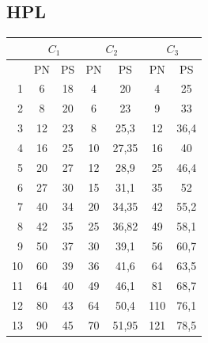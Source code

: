 	\subsection{HPL}
		\begin{table}
			\centering
			\begin{tabular}{|r||c|c||c|c||c|c|}
				\hline
				            & \multicolumn{2}{c|}{\(C_1\)} & \multicolumn{2}{c|}{\(C_2\)} & \multicolumn{2}{c|}{\(C_3\)} \\ \hline
				\textnumero &  PN &                     PS &  PN &                     PS &  PN & PS                     \\ \hline
				1           &   6 &                     18 &   4 &                     20 &   4 & 25                     \\ \hline
				2           &   8 &                     20 &   6 &                     23 &   9 & 33                     \\ \hline
				3           &  12 &                     23 &   8 &                   25,3 &  12 & 36,4                   \\ \hline
				4           &  16 &                     25 &  10 &                  27,35 &  16 & 40 					 \\ \hline
				5           &  20 &                     27 &  12 &                   28,9 &  25 & 46,4 					 \\ \hline
				6           &  27 &                     30 &  15 &                   31,1 &  35 & 52 					 \\ \hline
				7           &  40 &                     34 &  20 &                  34,35 &  42 & 55,2 					 \\ \hline
				8           &  42 &                     35 &  25 &                  36,82 &  49 & 58,1                   \\ \hline
				9           &  50 &                     37 &  30 &                   39,1 &  56 & 60,7                   \\ \hline
				10          &  60 &                     39 &  36 &                   41,6 &  64 & 63,5                   \\ \hline
				11          &  64 &                     40 &  49 &                   46,1 &  81 & 68,7                   \\ \hline
				12          &  80 &                     43 &  64 &                   50,4 & 110 & 76,1                   \\ \hline
				13          &  90 &                     45 &  70 &                  51,95 & 121 & 78,5                   \\ \hline

\end{tabular}
\end{table}
